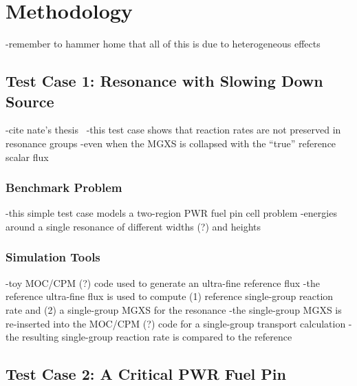 \section{Methodology}
\label{sec:test-cases}

-remember to hammer home that all of this is due to heterogeneous effects


\subsection{Test Case 1: Resonance with Slowing Down Source}
\label{subsec:test-case1}

-cite nate's thesis~\cite{gibson2016thesis}
-this test case shows that reaction rates are not preserved in resonance groups
  -even when the MGXS is collapsed with the ``true'' reference scalar flux

\subsubsection{Benchmark Problem}
\label{subsubsec:benchmark-case1}

-this simple test case models a two-region PWR fuel pin cell problem
-energies around a single resonance of different widths (?) and heights

\subsubsection{Simulation Tools}
\label{subsubsec:sim-tools-case1}

-toy MOC/CPM (?) code used to generate an ultra-fine reference flux
-the reference ultra-fine flux is used to compute (1) reference single-group reaction rate and (2) a single-group MGXS for the resonance
-the single-group MGXS is re-inserted into the MOC/CPM (?) code for a single-group transport calculation
-the resulting single-group reaction rate is compared to the reference



\subsection{Test Case 2: A Critical PWR Fuel Pin}
\label{subsec:test-case2}


